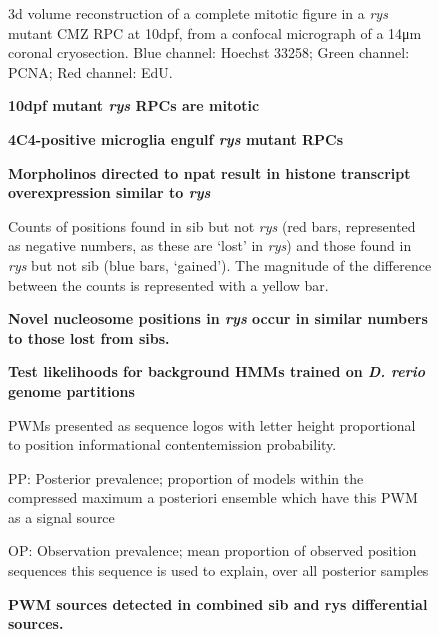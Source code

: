 \begin{figure}[!h]
    \caption{{\bf 10dpf mutant \textit{rys} RPCs are mitotic}} 3d volume reconstruction of a complete mitotic figure in a \textit{rys} mutant CMZ RPC at 10dpf, from a confocal micrograph of a 14\si{\micro\metre} coronal cryosection. Blue channel: Hoechst 33258; Green channel: PCNA; Red channel: EdU.
    \label{rysmitosis}
\end{figure}

\begin{figure}[!h]
    \caption{{\bf 4C4-positive microglia engulf \textit{rys} mutant RPCs}} 
    \label{phagocytosis}
\end{figure}


\begin{figure}[!h]
    \caption{{\bf Morpholinos directed to npat result in histone transcript overexpression similar to \textit{rys}}} 
    \label{morpholinoRTPCR}
\end{figure}

\begin{figure}[!h]
    \caption{{\bf Novel nucleosome positions in \textit{rys} occur in similar numbers to those lost from sibs.}}
    Counts of positions found in sib but not \textit{rys} (red bars, represented as negative numbers, as these are `lost' in \textit{rys}) and those found in \textit{rys} but not sib (blue bars, `gained'). The magnitude of the difference between the counts is represented with a yellow bar.
    \label{diffposdist}
\end{figure}

\begin{figure}[!h]
    \caption{{\bf Test likelihoods for background HMMs trained on \textit{D. rerio} genome partitions}}
    \label{BHMMlh}
\end{figure}

\begin{figure}[!h]
    \caption{{\bf PWM sources detected in combined sib and rys differential sources.}}
    PWMs presented as sequence logos with letter height proportional to position informational content\/emission probability.
    
    PP: Posterior prevalence; proportion of models within the compressed maximum a posteriori ensemble which have this PWM as a signal source

    OP: Observation prevalence; mean proportion of observed position sequences this sequence is used to explain, over all posterior samples
    \label{combinedmotifs}
\end{figure}

